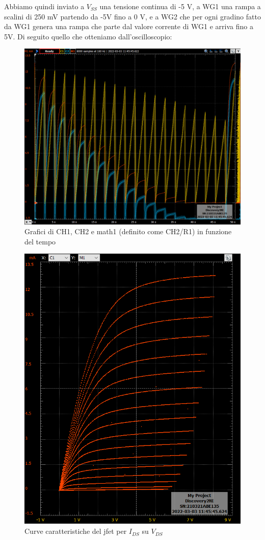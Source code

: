 \documentclass[10pt, a4paper, italian]{article}
\begin{document}
Abbiamo quindi inviato a $V_{SS}$ una tensione continua di -5 V, a WG1 una rampa a scalini di 250 mV partendo da -5V fino a 0 V, e a WG2 che per ogni gradino fatto da WG1 genera una rampa che parte dal valore corrente di WG1 e arriva fino a 5V.
Di seguito quello che otteniamo dall'oscilloscopio:
\begin{figure}[H]
    \centering
	\includegraphics[scale=0.4]{time}
    \caption{Grafici di CH1, CH2 e math1 (definito come CH2/R1) in funzione del tempo}
\end{figure}
\begin{figure}[H]
    \centering
	\includegraphics[scale=0.4]{vgs}
    \caption{Curve caratteristiche del jfet per $I_{DS}$ su $V_{DS}$}
\end{figure}
\end{document}
